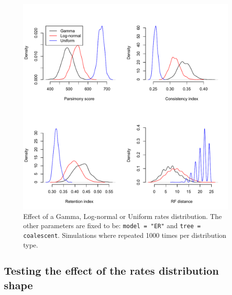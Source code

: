 \documentclass{article}\usepackage[]{graphicx}\usepackage[]{color}
\begin{document}
\begin{figure}[!htbp]
\centering
   \includegraphics[width=1\textwidth]{Rate_distribution_effect.pdf}
\caption{Effect of a Gamma, Log-normal or Uniform rates distribution.
The other parameters are fixed to be: \texttt{model = "ER"} and \texttt{tree = coalescent}.
Simulations where repeated 1000 times per distribution type.}
\label{Rate_distribution_effect}
\end{figure}

\subsection{Testing the effect of the rates distribution shape}
\end{document}

